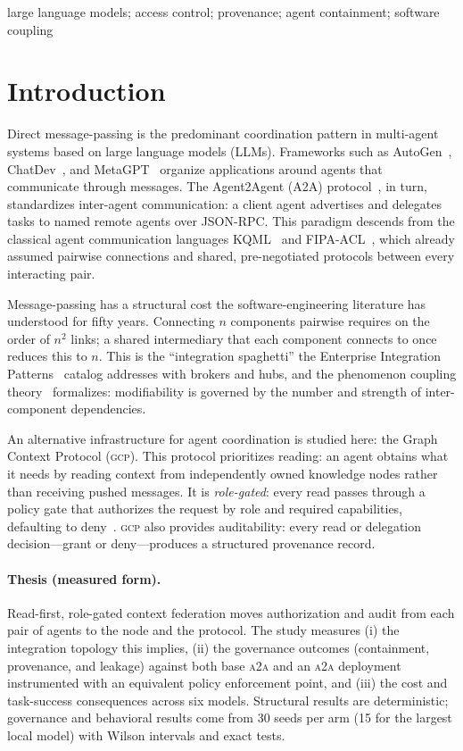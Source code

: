 \documentclass[conference,letterpaper]{IEEEtran}
\newcommand{\gcp}{\textsc{gcp}}
\newcommand{\ata}{\textsc{a2a}}
\begin{document}
\begin{IEEEkeywords}
large language models; access control; provenance; agent containment; software coupling
\end{IEEEkeywords}

\section{Introduction}

Direct message-passing is the predominant coordination pattern in multi-agent systems based on
large language models (LLMs). Frameworks such as AutoGen~\citep{wu2023autogen},
ChatDev~\citep{qian2024chatdev}, and MetaGPT~\citep{hong2024metagpt} organize applications around
agents that communicate through messages. The Agent2Agent (A2A) protocol~\citep{a2a2025}, in turn,
standardizes inter-agent communication: a client agent advertises and delegates tasks to named
remote agents over JSON-RPC. This paradigm descends from the classical agent communication
languages KQML~\citep{finin1994} and FIPA-ACL~\citep{fipa2002}, which already assumed pairwise
connections and shared, pre-negotiated protocols between every interacting pair.

Message-passing has a structural cost the software-engineering literature has understood for fifty
years. Connecting $n$ components pairwise requires on the order of $n^2$ links; a shared
intermediary that each component connects to once reduces this to $n$. This is the ``integration
spaghetti'' the Enterprise Integration Patterns~\citep{hohpe2003} catalog addresses with brokers
and hubs, and the phenomenon coupling theory~\citep{parnas1972,stevens1974,briand1999} formalizes:
modifiability is governed by the number and strength of inter-component dependencies.

An alternative infrastructure for agent coordination is studied here: the Graph Context Protocol
(\gcp{}). This protocol prioritizes reading: an agent obtains what it needs by reading context from
independently owned knowledge nodes rather than receiving pushed messages. It is \emph{role-gated}:
every read passes through a policy gate that authorizes the request by role and required
capabilities, defaulting to deny~\citep{saltzer1975,sandhu1996}. \gcp{} also provides
auditability: every read or delegation decision---grant or deny---produces a structured provenance
record.

\paragraph{Thesis (measured form).} Read-first, role-gated context federation moves authorization and audit from each pair of agents to the node and the protocol. The study measures (i) the integration topology this implies, (ii) the governance outcomes (containment, provenance, and leakage) against both base \ata{} and an \ata{} deployment instrumented with an equivalent policy enforcement point, and (iii) the cost and task-success consequences across six models. Structural results are deterministic; governance and behavioral results come from 30 seeds per arm (15 for the largest local model) with Wilson intervals and exact tests.
\end{document}
